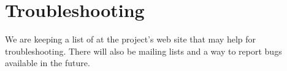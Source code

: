 %

\section{Troubleshooting}

We are keeping a list of  at the project's web site that may help for troubleshooting.  There will also be mailing lists and a way to report bugs available in the future.

